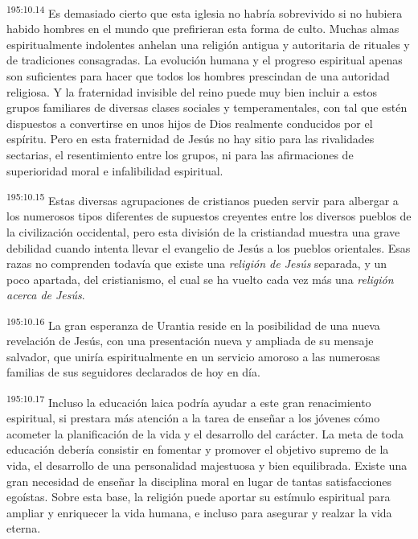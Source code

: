 \par
\textsuperscript{195:10.14} Es demasiado cierto que esta iglesia no habría sobrevivido si no hubiera habido hombres en el mundo que prefirieran esta forma de culto. Muchas almas espiritualmente indolentes anhelan una religión antigua y autoritaria de rituales y de tradiciones consagradas. La evolución humana y el progreso espiritual apenas son suficientes para hacer que todos los hombres prescindan de una autoridad religiosa. Y la fraternidad invisible del reino puede muy bien incluir a estos grupos familiares de diversas clases sociales y temperamentales, con tal que estén dispuestos a convertirse en unos hijos de Dios realmente conducidos por el espíritu. Pero en esta fraternidad de Jesús no hay sitio para las rivalidades sectarias, el resentimiento entre los grupos, ni para las afirmaciones de superioridad moral e infalibilidad espiritual.

\par
\textsuperscript{195:10.15} Estas diversas agrupaciones de cristianos pueden servir para albergar a los numerosos tipos diferentes de supuestos creyentes entre los diversos pueblos de la civilización occidental, pero esta división de la cristiandad muestra una grave debilidad cuando intenta llevar el evangelio de Jesús a los pueblos orientales. Esas razas no comprenden todavía que existe una \textit{religión de Jesús} separada, y un poco apartada, del cristianismo, el cual se ha vuelto cada vez más una \textit{religión acerca de Jesús}.

\par
\textsuperscript{195:10.16} La gran esperanza de Urantia reside en la posibilidad de una nueva revelación de Jesús, con una presentación nueva y ampliada de su mensaje salvador, que uniría espiritualmente en un servicio amoroso a las numerosas familias de sus seguidores declarados de hoy en día.

\par
\textsuperscript{195:10.17} Incluso la educación laica podría ayudar a este gran renacimiento espiritual, si prestara más atención a la tarea de enseñar a los jóvenes cómo acometer la planificación de la vida y el desarrollo del carácter. La meta de toda educación debería consistir en fomentar y promover el objetivo supremo de la vida, el desarrollo de una personalidad majestuosa y bien equilibrada. Existe una gran necesidad de enseñar la disciplina moral en lugar de tantas satisfacciones egoístas. Sobre esta base, la religión puede aportar su estímulo espiritual para ampliar y enriquecer la vida humana, e incluso para asegurar y realzar la vida eterna.

